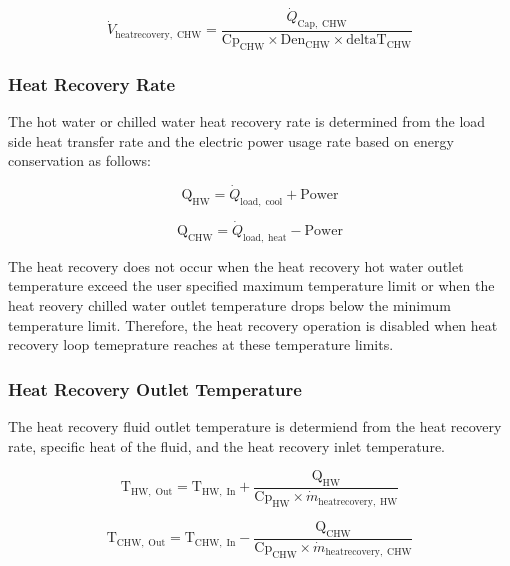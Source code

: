 \begin{equation}
\dot{V}_\mathrm{heatrecovery,\; CHW} = \frac{\dot{Q}_\mathrm{Cap,\; CHW}}{\mathrm{Cp}_\mathrm{CHW} \times \mathrm{Den}_\mathrm{CHW} \times \mathrm{deltaT}_\mathrm{CHW}}
\end{equation}

\subsubsection{Heat Recovery Rate}
The hot water or chilled water heat recovery rate is determined from the load side heat transfer rate and the electric power usage rate based on energy conservation as follows: 

\begin{equation}
\mathrm{Q}_\mathrm{HW} = \dot{Q}_\mathrm{load,\; cool} + \mathrm{Power}
\end{equation}

\begin{equation}
\mathrm{Q}_\mathrm{CHW}  = \dot{Q}_\mathrm{load,\; heat} - \mathrm{Power}
\end{equation}

The heat recovery does not occur when the heat recovery hot water outlet temperature exceed the user specified maximum temperature limit or when the heat reovery chilled water outlet temperature drops below the minimum temperature limit. Therefore, the heat recovery operation is disabled when heat recovery loop temeprature reaches at these temperature limits.

\subsubsection{Heat Recovery Outlet Temperature}
The heat recovery fluid outlet temperature is determiend from the heat recovery rate, specific heat of the fluid, and the heat recovery inlet temperature.
 
\begin{equation}
\mathrm{T}_\mathrm{HW,\; Out} = \mathrm{T}_\mathrm{HW,\; In} + \frac{\mathrm{Q}_\mathrm{HW}}{\mathrm{Cp}_\mathrm{HW} \times \dot{m}_\mathrm{heatrecovery,\; HW}}
\end{equation}

\begin{equation}
\mathrm{T}_\mathrm{CHW,\; Out} = \mathrm{T}_\mathrm{CHW,\; In} - \frac{\mathrm{Q}_\mathrm{CHW}}{\mathrm{Cp}_\mathrm{CHW} \times \dot{m}_\mathrm{heatrecovery,\; CHW}}
\end{equation}

